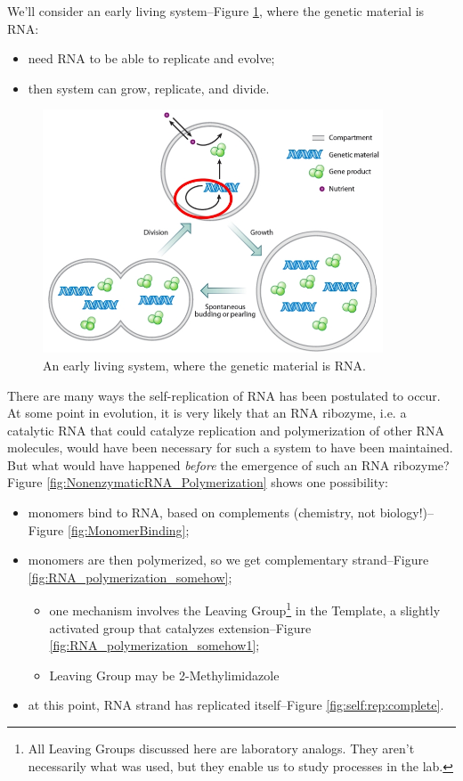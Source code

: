 \documentclass[]{article}
\begin{document}
We'll consider an early living system--Figure \ref{fig:RNA_WorldTheory1}, where the genetic material is RNA:
\begin{itemize}
	\item need RNA to be able to replicate and evolve;
	\item then system can grow, replicate, and divide.
\end{itemize}
 

\begin{figure}[H]
	\caption[An early living system, where the genetic material is RNA.]{An early living system, where the genetic material is RNA\cite{blain2014progress}.}\label{fig:RNA_WorldTheory1}
	\includegraphics[width=0.9\textwidth]{RNA_WorldTheory1}
\end{figure}

There are many ways the self-replication of RNA has been postulated to occur. At some point in evolution, it is very likely that an RNA ribozyme, i.e. a catalytic RNA that could catalyze replication and polymerization of other RNA molecules, would have been necessary for such a system to have been maintained. But what would have happened \emph{before} the emergence of such an RNA ribozyme? Figure \ref{fig:NonenzymaticRNA_Polymerization} shows one possibility:

\begin{itemize}
	\item monomers bind to RNA, based on complements (chemistry, not biology!)--Figure \ref{fig:MonomerBinding};
	\item monomers are then polymerized, so we get complementary strand--Figure \ref{fig:RNA_polymerization_somehow};
	\begin{itemize}
		\item one mechanism involves the Leaving Group\footnote{All Leaving Groups discussed here are laboratory analogs. They aren't necessarily what was used, but they enable us to study processes in the lab.} in the Template, a slightly activated group that catalyzes extension--Figure \ref{fig:RNA_polymerization_somehow1};
		\item Leaving Group may be 2-Methylimidazole
	\end{itemize} 
	\item at this point, RNA strand has replicated itself--Figure \ref{fig:self:rep:complete}.
\end{itemize}
\end{document}
